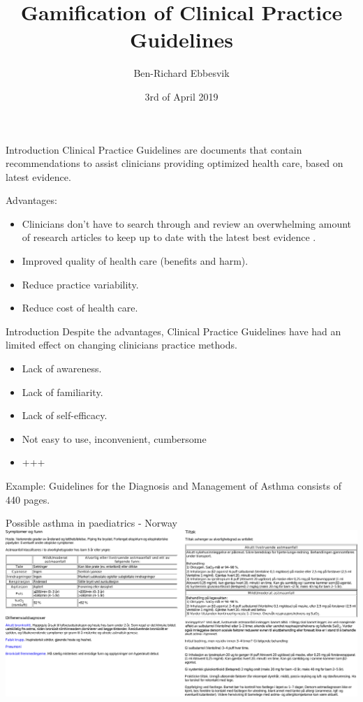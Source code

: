 \documentclass{beamer}
\begin{document}
\title{Gamification of Clinical Practice Guidelines}
\author{Ben-Richard Ebbesvik}
\date{3rd of April 2019}
\subject{Master thesis}
\frame{\titlepage}


\begin{frame}{Introduction}
Clinical Practice Guidelines are documents that contain recommendations to assist clinicians providing optimized health care, based on latest evidence. 

Advantages:
\begin{itemize}
	\item Clinicians don't have to search through and review an overwhelming amount of research articles to keep up to date with the latest best evidence .
	\item Improved quality of health care (benefits and harm).
	\item Reduce practice variability.
	\item Reduce cost of health care.
\end{itemize}	
\end{frame}

\begin{frame}{Introduction}
Despite the advantages, Clinical Practice Guidelines have had an limited effect on changing clinicians practice methods.
\begin{itemize}
	\item Lack of awareness.
	\item Lack of familiarity.
	\item  Lack of self-efficacy.
	\item Not easy to use, inconvenient, cumbersome
	\item +++
\end{itemize}
Example: Guidelines for the Diagnosis and Management of Asthma consists of 440 pages.
\end{frame}

\begin{frame}{Possible asthma in paediatrics - Norway}
\includegraphics[scale=0.32]{NorwayCPG}
\end{frame}
\end{document}
